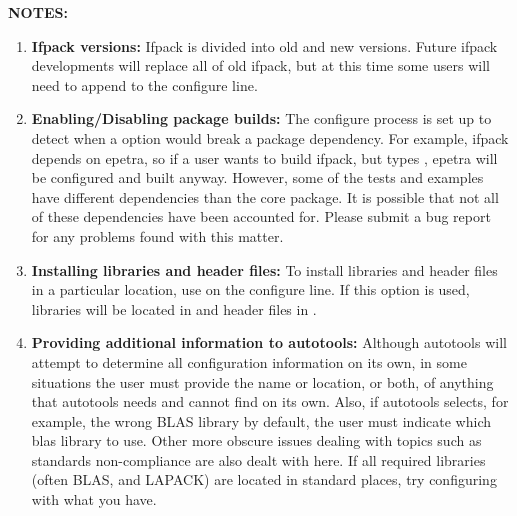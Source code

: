 \documentclass[12pt,strict]{TrilinosDevGuide}
\begin{document}
{\bf NOTES:} 
\begin{enumerate}
\item {\bf Ifpack versions:} 
Ifpack is divided into old and new versions.  Future ifpack developments 
will replace all of old ifpack, but at this time some users will need to append
 to the configure line.

\item {\bf Enabling/Disabling package builds:} 
The configure process is set up to detect when a 
 option would break a package dependency.  
For example, ifpack depends on epetra, so if a user wants to build ifpack, but 
types , epetra will be configured and built 
anyway.  However, some of the tests and examples have different dependencies 
than the core package.  It is possible that not all of these dependencies have 
been accounted for.  Please submit a bug report for any problems found with 
this matter.

\item {\bf Installing libraries and header files:}
To install libraries and header files in a particular location, 
use  on the configure line.  If this option is 
used, libraries will be located in  and header files in 
.

\item {\bf Providing additional information to autotools:}
Although autotools will attempt to determine all configuration
information on its own, in some situations the user must provide 
the name or location, or both, of anything that autotools needs and 
cannot find on its own.  Also, if autotools selects, for example, the wrong 
BLAS library by default, the user must indicate which blas library to use.  
Other more obscure issues dealing with topics such as standards 
non-compliance are also dealt with here.  If all required libraries (often 
BLAS, and LAPACK) are located in standard places, try configuring with what 
you have.


\end{enumerate}
\end{document}
